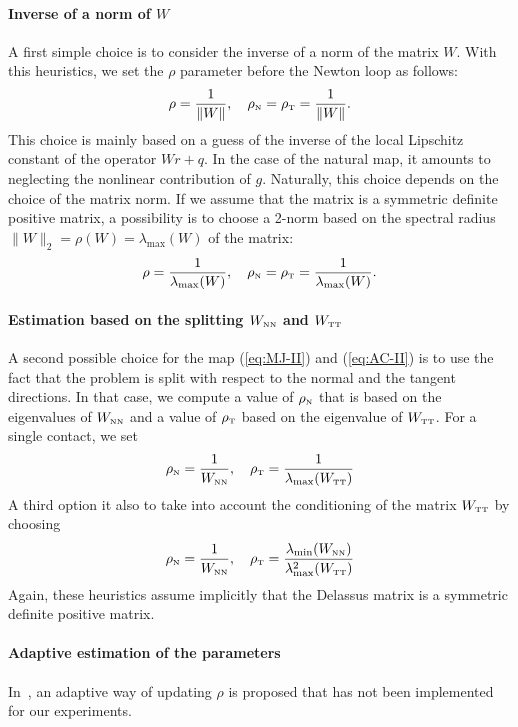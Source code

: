 \paragraph{Inverse of a norm of $W$} A first simple choice is to consider the inverse of a norm of the matrix $W$. With this heuristics, we set the $\rho$ parameter before the Newton loop as follows:
\begin{equation}
  \label{eq:rho-1}
  \rho = \frac 1 {\|W\|}, \quad  \rho_\n =  \rho_\t = \frac 1 {\|W\|}.
\end{equation}
This choice is mainly based on a guess of the inverse of the local Lipschitz constant of the operator $Wr+q$. In the case of the natural map, it amounts to neglecting the nonlinear contribution of $g$. Naturally, this choice depends on the choice of the matrix norm. If we assume that the matrix is a symmetric definite positive matrix, a possibility is to choose a 2-norm based on the spectral radius $\|W\|_2 = \rho(W) =\lambda_{\max}(W)$ of the matrix:
\begin{equation}
  \label{eq:rho-2}
  \rho = \frac 1 {\lambda_{\max}(W)}, \quad  \rho_\n = \rho_\t = \frac 1 {\lambda_{\max}(W)}.
\end{equation}

\paragraph{Estimation based on the splitting  $W_{{\hbox{\tiny{N}}}{\hbox{\tiny{N}}}}$ and $W_{{\hbox{\tiny{T}}}{\hbox{\tiny{T}}}}$} A second possible choice for the map  (\ref{eq:MJ-II}) and (\ref{eq:AC-II}) is to use the fact that the problem is split with respect to the normal and the tangent directions. In that case, we compute a value of $\rho_{\hbox{\tiny{N}}}$ that is based on the eigenvalues of $W_{{\hbox{\tiny{N}}}{\hbox{\tiny{N}}}}$ and a value of $\rho_{\hbox{\tiny{T}}}$ based on the eigenvalue of $W_{{\hbox{\tiny{T}}}{\hbox{\tiny{T}}}}$. For a single contact, we set
\begin{equation}
  \label{eq:rho-3}
  \rho_\n = \frac 1 {W_{\n\n}}, \quad \rho_\t = \frac{1}{\lambda_{\max}(W_{\t\t})}
\end{equation}
A third option it also to take into account the conditioning of the matrix $W_{{\hbox{\tiny{T}}}{\hbox{\tiny{T}}}}$ by choosing
\begin{equation}
  \label{eq:rho-4}
  \rho_\n = \frac 1 {W_{\n\n}}, \quad \rho_\t = \frac{\lambda_{\min}(W_{\n\n})}{\lambda^2_{\max}(W_{\t\t})}
\end{equation}
Again, these heuristics assume implicitly that the Delassus matrix is a symmetric definite positive matrix. 
\paragraph{Adaptive estimation of the parameters} In~\cite{Koziara.Bicanic_CMAME2008}, an adaptive way of updating $\rho$ is proposed that has not been implemented for our experiments.

